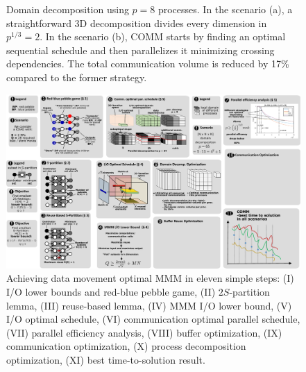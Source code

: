 \documentclass[sigplan,review,anonymous]{acmart}\settopmatter{printfolios=true,printccs=false,printacmref=false}
\begin{document}
\begin{figure}[!tbp]
	\centering
	\hfill
	\caption{Domain decomposition using $p=8$  processes. In 
		the scenario (a), a straightforward 3D decomposition 
		divides every dimension in 
		$p^{1/3}=2$. In the scenario (b), COMM starts by 
		finding an optimal sequential 
		schedule and then parallelizes it minimizing crossing 
		dependencies. The total 
		communication volume is reduced by 17\% compared to 
		the former strategy.}
	\label{fig:topdown-vs-bottomup}
\end{figure}

\begin{figure}[!tbp]
  \includegraphics[width=\textwidth]{figures/paperOrganization}
  \caption{Achieving data movement optimal MMM in eleven 
  simple 
    steps: (I) I/O lower bounds and red-blue pebble game, 
    (II) 
    $2S$-partition lemma, (III) reuse-based lemma, (IV) MMM 
    I/O 
    lower 
    bound, (V) I/O optimal schedule, (VI) communication 
    optimal 
    parallel schedule, (VII) parallel efficiency analysis, 
    (VIII) 
    buffer optimization, (IX) communication optimization, (X) 
    process 
    decomposition optimization, (XI) best time-to-solution 
    result. }
  \label{fig:paperOrganization}
\end{figure}
\end{document}
